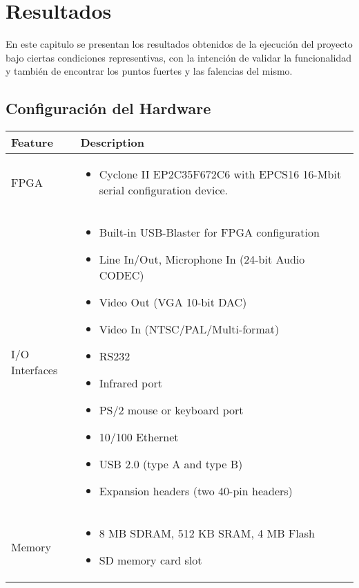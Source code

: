 \chapter{Resultados}

En este capitulo se presentan los resultados obtenidos de la ejecución del proyecto bajo ciertas condiciones representivas, con la intención de validar la funcionalidad y también de encontrar los puntos fuertes y las falencias del mismo.

\section{Configuración del Hardware}

\begin{center}
	\begin{longtable}{|l|p{4.75in}|} \hline
		\textbf{Feature} & \textbf{Description} \\ \hline
		FPGA & \begin{itemize}
			\item Cyclone II EP2C35F672C6 with EPCS16 16-Mbit serial configuration device.
			\end{itemize} \\ \hline
		I/O Interfaces &     \begin{itemize}
					\item Built-in USB-Blaster for FPGA configuration
    					\item Line In/Out, Microphone In (24-bit Audio CODEC)
   					\item Video Out (VGA 10-bit DAC)
   					\item Video In (NTSC/PAL/Multi-format)
   					\item RS232
    					\item Infrared port
   					\item PS/2 mouse or keyboard port
    					\item 10/100 Ethernet
   					\item USB 2.0 (type A and type B)
    					\item Expansion headers (two 40-pin headers)
				     \end{itemize} \\ \hline
		Memory & \begin{itemize}
					\item 8 MB SDRAM, 512 KB SRAM, 4 MB Flash
    					\item SD memory card slot
    			 \end{itemize} \\ \hline

\end{longtable}
\end{center}
